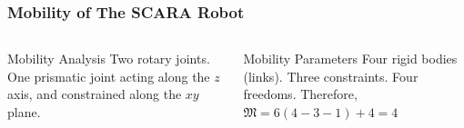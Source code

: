 %
\begin{frame}
	\frametitle{Mobility of The SCARA Robot}
	\begin{columns}[]
		\begin{column}{.5\linewidth}
			\begin{block}{Mobility Analysis}
				Two rotary joints. One prismatic joint acting along the $z$ axis, and constrained along the $xy$ plane. 
			\end{block}
		\end{column}
		\begin{column}{.5\linewidth}
			\begin{block}{Mobility Parameters}			
			Four rigid bodies (links). Three constraints.  Four freedoms. Therefore, $\mathfrak{M}=6(4-3-1)+4=4$
			\end{block}
		\end{column}
	\end{columns}
\end{frame}

